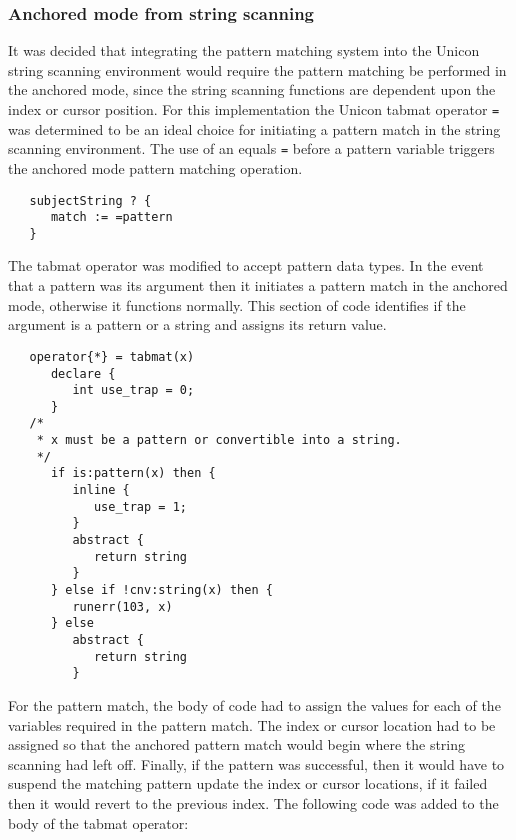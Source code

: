 \documentclass{article}
\begin{document}
\subsubsection{Anchored mode from string scanning}
It was decided that integrating the pattern matching system into the Unicon string scanning environment would require the pattern matching be performed in the anchored mode, since the string scanning functions are dependent upon the index or cursor position.  For this implementation the Unicon tabmat operator \texttt{=} was determined to be an ideal choice for initiating a pattern match in the string scanning environment.  The use of an equals \texttt{=} before a pattern variable triggers the anchored mode pattern matching operation.
 
\begin{verbatim}
   subjectString ? {
      match := =pattern
   }
\end{verbatim}

The tabmat operator was modified to accept pattern data types.  In the event that a pattern was its argument then it initiates a pattern match in the anchored mode, otherwise it functions normally.  This section of code identifies if the argument is a pattern or a string and assigns its return value.

\begin{verbatim}
   operator{*} = tabmat(x)
      declare {
         int use_trap = 0;
      }
   /*
    * x must be a pattern or convertible into a string.
    */
      if is:pattern(x) then {
         inline {
            use_trap = 1;
         }
         abstract {
            return string
         }
      } else if !cnv:string(x) then {
         runerr(103, x)
      } else 
         abstract {
            return string
         }
\end{verbatim}

For the pattern match, the body of code had to assign the values for each of the variables required in the pattern match.  The index or cursor location had to be assigned so that the anchored pattern match would begin where the string scanning had left off.  Finally, if the pattern was successful, then it would have to suspend the matching pattern update the index or cursor locations, if it failed then it would revert to the previous index.  The following code was added to the body of the tabmat operator:
\end{document}
